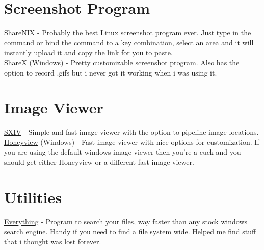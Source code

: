 \documentclass{article}
\begin{document}
\section{Screenshot Program}
	\href{https://github.com/Francesco149/sharenix}{ShareNIX} - Probably the best Linux screenshot program ever. Just type in the command or bind the command to a key combination, select an area and it will instantly upload it and copy the link for you to paste.\\
	\href{https://getsharex.com/}{ShareX} (Windows) - Pretty customizable screenshot program. Also has the option to record .gifs but i never got it working when i was using it.
\section{Image Viewer}
	\href{https://github.com/muennich/sxiv}{SXIV} - Simple and fast image viewer with the option to pipeline image locations.\\
	\href{http://www.bandisoft.com/honeyview/}{Honeyview} (Windows) - Fast image viewer with nice options for customization. If you are using the default windows image viewer then you're a cuck and you should get either Honeyview or a different fast image viewer.
\section{Utilities}
	\href{https://www.voidtools.com/}{Everything} - Program to search your files, way faster than any stock windows search engine. Handy if you need to find a file system wide. Helped me find stuff that i thought was lost forever.
\end{document}
